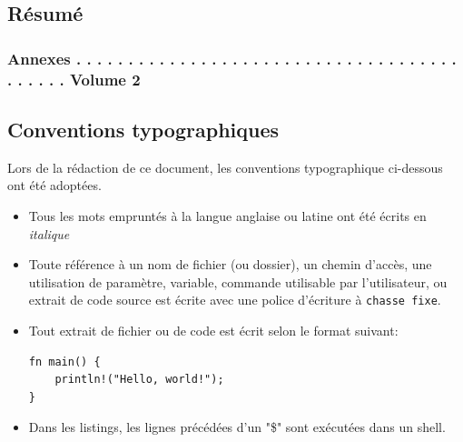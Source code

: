 \documentclass[a4paper, 12pt]{article}
\newenvironment{code}{\captionsetup{type=listing}}{}
\begin{document}
\subsection*{Résumé} %

\newpage

\tableofcontents
\subsubsection*{Annexes . . . . . . . . . . . . . . . . . . . . . . . . . . . . . . . . . . . . . . . . . . . Volume 2}
\newpage
{}
\listoffigures
\newpage
\renewcommand{\listtablename}{Table des tables}
\listoftables
\newpage
\renewcommand\listoflistingscaption{Table des listings de code source}
\listoflistings
\newpage

\subsection*{Conventions typographiques} %
Lors de la rédaction de ce document, les conventions typographique ci-dessous ont
été adoptées.
\begin{itemize}[label=\textbullet]
	\item Tous les mots empruntés à la langue anglaise ou latine ont été écrits en \textit{italique}
	\item Toute référence à un nom de fichier (ou dossier), un chemin d'accès, une 
    utilisation de paramètre, variable, commande utilisable par l'utilisateur, ou extrait de code 
    source est écrite avec une police d'écriture à \texttt{chasse fixe}.
	\item Tout extrait de fichier ou de code est écrit selon le format suivant:
    \bigbreak
    \begin{code}
        \begin{verbatim}
fn main() {
    println!("Hello, world!");
}
        \end{verbatim}
    \end{code}
    \item Dans les listings, les lignes précédées d'un "\$" sont exécutées dans un shell.
\end{itemize}
\end{document}
